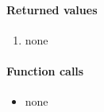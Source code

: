 \paragraph{Returned values}
\begin{enumerate}
\item none
\end{enumerate}

\paragraph{Function calls}
\begin{itemize}
\item none
\end{itemize}

